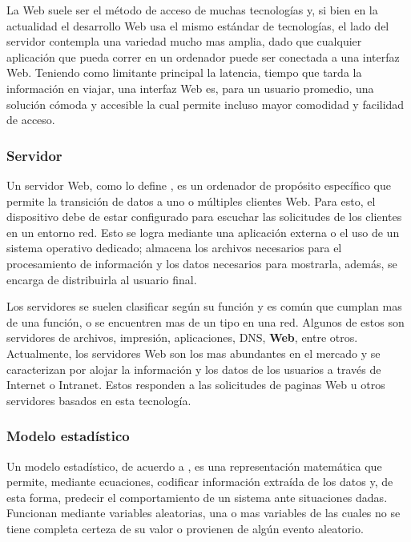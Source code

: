 La Web suele ser el método de acceso de muchas tecnologías y, si bien en la actualidad
el desarrollo Web usa el mismo estándar de tecnologías, el lado del servidor
contempla una variedad mucho mas amplia, dado que cualquier aplicación que
pueda correr en un ordenador puede ser conectada a una interfaz Web. Teniendo
como limitante principal la latencia,  tiempo que tarda la información en viajar,
una interfaz Web es, para un usuario promedio, una solución cómoda y
accesible la cual  permite incluso  mayor comodidad y facilidad de acceso.


\subsubsection*{Servidor}

Un servidor Web, como lo define \Cite{servidor},  es un ordenador de propósito
específico que permite la
transición de datos a uno o múltiples clientes Web. Para esto, el dispositivo
debe de estar configurado para escuchar las solicitudes de los clientes en un
entorno red. Esto se logra mediante una aplicación externa o el uso de un
sistema operativo dedicado; almacena los archivos
necesarios para el procesamiento de información y los datos necesarios para
mostrarla, además, se encarga de distribuirla al usuario final.

Los servidores se suelen clasificar según su función y es común que cumplan mas
de una función, o se encuentren mas de un tipo en una red. Algunos de estos son
servidores de archivos, impresión, aplicaciones, DNS, \textbf{Web}, entre otros.
Actualmente, los servidores Web son los mas abundantes en el mercado
y se caracterizan por alojar la información y los datos de los usuarios a través
de Internet o Intranet. Estos responden a las solicitudes de paginas Web u otros
servidores basados en esta tecnología.


\subsubsection{Modelo estadístico}

Un modelo estadístico, de acuerdo a \cite{modeloIBM}, es una representación
matemática que permite, mediante
ecuaciones, codificar información extraída de los datos y, de esta forma,
predecir el comportamiento de un sistema ante situaciones dadas. Funcionan
mediante  variables aleatorias, una o mas variables de las cuales no
se tiene completa certeza de su valor o provienen de algún evento aleatorio.

